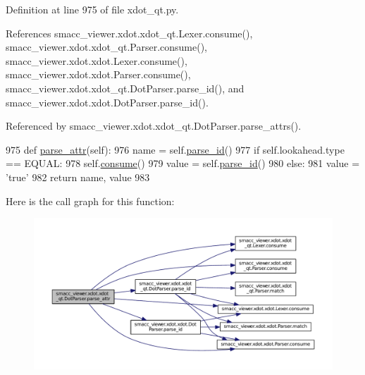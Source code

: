 Definition at line 975 of file xdot\+\_\+qt.\+py.



References smacc\+\_\+viewer.\+xdot.\+xdot\+\_\+qt.\+Lexer.\+consume(), smacc\+\_\+viewer.\+xdot.\+xdot\+\_\+qt.\+Parser.\+consume(), smacc\+\_\+viewer.\+xdot.\+xdot.\+Lexer.\+consume(), smacc\+\_\+viewer.\+xdot.\+xdot.\+Parser.\+consume(), smacc\+\_\+viewer.\+xdot.\+xdot\+\_\+qt.\+Dot\+Parser.\+parse\+\_\+id(), and smacc\+\_\+viewer.\+xdot.\+xdot.\+Dot\+Parser.\+parse\+\_\+id().



Referenced by smacc\+\_\+viewer.\+xdot.\+xdot\+\_\+qt.\+Dot\+Parser.\+parse\+\_\+attrs().


\begin{DoxyCode}
975     \textcolor{keyword}{def }\hyperlink{classsmacc__viewer_1_1xdot_1_1xdot__qt_1_1DotParser_ab3eea2cffc30fd68114edb0e8960d4a6}{parse\_attr}(self):
976         name = self.\hyperlink{classsmacc__viewer_1_1xdot_1_1xdot__qt_1_1DotParser_a7ed529e7510bac45a0df282195f3dfea}{parse\_id}()
977         \textcolor{keywordflow}{if} self.lookahead.type == EQUAL:
978             self.\hyperlink{classsmacc__viewer_1_1xdot_1_1xdot__qt_1_1Parser_aba6f69f48f1d4e25b13e4cb297f509e6}{consume}()
979             value = self.\hyperlink{classsmacc__viewer_1_1xdot_1_1xdot__qt_1_1DotParser_a7ed529e7510bac45a0df282195f3dfea}{parse\_id}()
980         \textcolor{keywordflow}{else}:
981             value = \textcolor{stringliteral}{'true'}
982         \textcolor{keywordflow}{return} name, value
983 
\end{DoxyCode}


Here is the call graph for this function\+:
\nopagebreak
\begin{figure}[H]
\begin{center}
\leavevmode
\includegraphics[width=350pt]{classsmacc__viewer_1_1xdot_1_1xdot__qt_1_1DotParser_ab3eea2cffc30fd68114edb0e8960d4a6_cgraph}
\end{center}
\end{figure}




